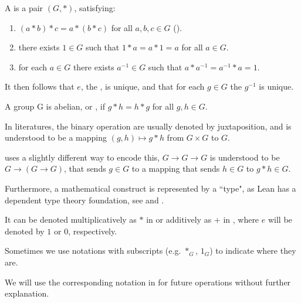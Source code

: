 \begin{definition}[Group]
    \label{Group}
    \leanok

    A  is a pair $(G, *)$, satisfying:

    \begin{enumerate}
    \item $(a * b) * c = a * (b * c)$ for all $a, b, c \in G$ ().
    \item there exists $1 \in G$ such that $1 * a = a * 1 = a$ for all $a \in G$.
    \item for each $a \in G$ there exists $a^{-1} \in G$ such that $a * a^{-1} = a^{-1} * a = 1$.

    \end{enumerate}

\end{definition}

\begin{remark}
    \label{mk:Group}
    
    It then follows that $e$, the , is unique, and that for each $g \in G$ the  $g^{-1}$ is unique.

    A group G is abelian, or , if $g * h = h * g$ for all $g, h \in G$.

\end{remark}

\begin{remark}
    \label{mk:Notation}

    In literatures, the binary operation are usually denoted by juxtaposition, and is understood to be a mapping
    $(g, h) \mapsto g * h$ from $G \times G$ to $G$.
    
    \Mathlib uses a slightly different way to encode this, $G \to G \to G$ is understood to be $G \to (G \to G)$,
    that sends $g \in G$ to a mapping that sends $h \in G$ to $g * h \in G$.
    
    Furthermore, a mathematical construct is represented by a ``type", as Lean has a dependent type theory foundation,
    see \cite{carneiro2019type} and \cite[section 3.2]{ullrich2023extensible}.
    
    It can be denoted multiplicatively as $*$ in 
    or additively as $+$ in , where $e$ will be denoted by $1$ or $0$, respectively.

    Sometimes we use notations with subscripts (e.g. $*_G$, $1_G$) to indicate where they are.

    We will use the corresponding notation in \Mathlib for future operations without further explanation.

\end{remark}


